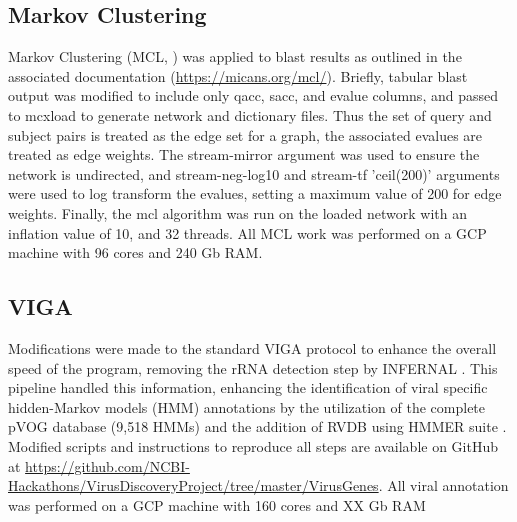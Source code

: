   \subsection{Markov Clustering}
  Markov Clustering (MCL, \cite{Enright2002}) was applied to blast results as
  outlined in the associated documentation (\url{https://micans.org/mcl/}).
  Briefly, tabular blast output was modified to include only qacc, sacc, and
  evalue columns, and passed to mcxload to generate network and dictionary
  files. Thus the set of query and subject pairs is treated as the edge set for
  a graph, the associated evalues are treated as edge weights. The
  stream-mirror argument was used to ensure the network is undirected, and
  stream-neg-log10  and stream-tf 'ceil(200)' arguments were used to log
  transform the evalues, setting a maximum value of 200 for edge weights.
  Finally, the mcl algorithm was run on the loaded network with an inflation
  value of 10, and 32 threads. All MCL work was performed on a GCP machine with
  96 cores and 240 Gb RAM.

  \subsection{VIGA}
  Modifications were made to the standard VIGA \cite{Gonzalez-Tortuero2018}
  protocol to enhance the overall speed of the program, removing the rRNA
  detection step by INFERNAL \cite{Nawrocki2013}. This pipeline handled this
  information, enhancing the identification of viral specific hidden-Markov
  models (HMM) annotations by the utilization of the complete pVOG database
  \cite{Grazziotin2017} (9,518 HMMs) and the addition of RVDB
  \cite{Goodacre2018} using HMMER suite \cite{hmmer}. Modified scripts and
  instructions to reproduce all steps are available on GitHub at
  \url{https://github.com/NCBI-Hackathons/VirusDiscoveryProject/tree/master/VirusGenes}.
  All viral annotation was performed on a GCP machine with 160 cores and XX Gb
  RAM

